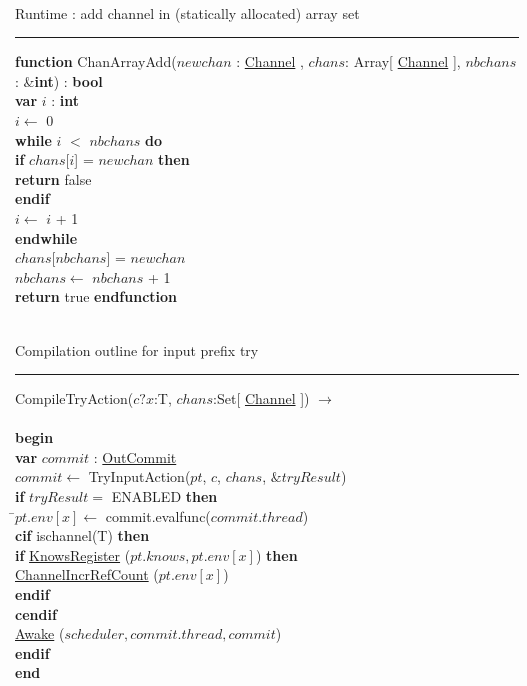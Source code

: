 \documentclass[a4paper,11pt]{article}
\newenvironment{program}{
  \begin{sffamily}
  \begin{scriptsize}
  \begin{tabbing}}
 {\end{tabbing}
  \end{scriptsize}
  \end{sffamily}}
\newcommand{\kw}[1]{\textsf{\textbf{#1}}}
\newcommand{\pindent}{\hspace{2em}\=}
\newcommand{\compiletime}[1]{\textcolor{compilecolor}{#1}}
\newcommand{\algotitle}[1]{\noindent\\ \noindent#1\par\nobreak\vspace{3pt}\hrule\vspace{6pt}}
\newcommand{\algosection}[1]{
  \phantomsection
  \algotitle{#1}
}
\newcommand{\myref}[1]{
  \hyperref[#1]{#1}
}
\begin{document}
\algosection{Runtime : add channel in (statically allocated) array set}
\begin{program}
  \kw{function} ChanArrayAdd($newchan$ : \myref{Channel}, $chans$: Array[\myref{Channel}], $nbchans$ : \&\kw{int}) : \kw{bool} \\
  \pindent \kw{var} $i$ : \kw{int} \\
  \> $i \leftarrow$ 0 \\
  \> \kw{while} $i$ $<$ $nbchans$ \kw{do}\\
  \> \pindent \kw{if} $chans$[$i$] = $newchan$ \kw{then} \\
  \> \> \pindent \kw{return} false \\
  \> \> \kw{endif} \\
  \> \> $i \leftarrow$ $i$ + 1 \\
  \> \kw{endwhile} \\
  \> $chans$[$nbchans$] = $newchan$ \\
  \> $nbchans \leftarrow$ $nbchans$ + 1 \\
  \> \kw{return} true
  \kw{endfunction}
\end{program}

\algosection{Compilation outline for input prefix try}
\begin{program}
  \compiletime{CompileTryAction($c?x$:T, $chans$:Set[\myref{Channel}]) $\rightarrow$} \\ \\
  \kw{begin} \\
  \pindent\kw{var} $commit$ : \myref{OutCommit} \\
  \> $commit \leftarrow$ TryInputAction($pt$, $c$, $chans$, $\& tryResult$) \\
  \>\kw{if} $tryResult =$ ENABLED \kw{then} \\
  \>\pindent $pt.env[x] \leftarrow$ commit.evalfunc($commit.thread$) \\
  \>\>\compiletime{\kw{cif} ischannel(T) \kw{then}} \\
  \>\>\pindent\kw{if} \myref{KnowsRegister}($pt.knows, pt.env[x]$) \kw{then} \\
  \>\>\>\pindent \myref{ChannelIncrRefCount}($pt.env[x]$) \\
  \>\>\>\kw{endif} \\
  \>\>\compiletime{\kw{cendif}} \\
  \>\>\myref{Awake}($scheduler, commit.thread, commit$) \\
  \>\kw{endif} \\
  \kw{end}
\end{program}
\end{document}

